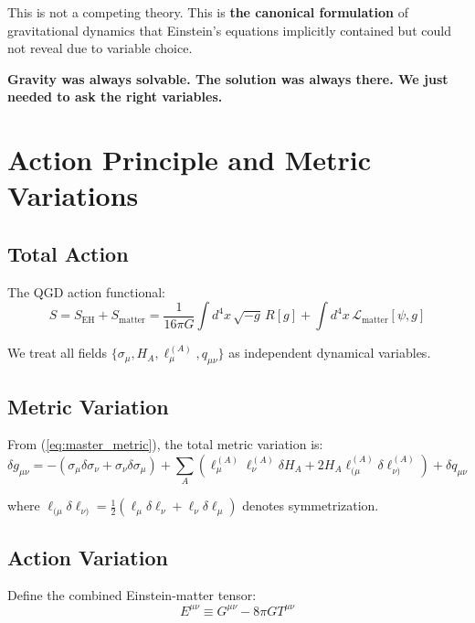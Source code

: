\documentclass[11pt,a4paper]{article}
\theoremstyle{definition}
\theoremstyle{remark}
\begin{document}
		This is not a competing theory. This is \textbf{the canonical formulation} of gravitational dynamics that Einstein's equations implicitly contained but could not reveal due to variable choice.
		
		\textbf{Gravity was always solvable. The solution was always there. We just needed to ask the right variables.}
		
		
		\section{Action Principle and Metric Variations}
		
		\subsection{Total Action}
		
		The QGD action functional:
		\begin{equation}\label{eq:action_total}
			S = S_{\text{EH}} + S_{\text{matter}} = \frac{1}{16\pi G}\int d^4x\, \sqrt{-g}\, R[g] + \int d^4x\, \mathcal{L}_{\text{matter}}[\psi, g]
		\end{equation}
		
		We treat all fields $\{\sigma_\mu, H_A, \ell_\mu^{(A)}, q_{\mu\nu}\}$ as independent dynamical variables.
		
		\subsection{Metric Variation}
		
		From (\ref{eq:master_metric}), the total metric variation is:
		\begin{equation}\label{eq:metric_variation}
			\delta g_{\mu\nu} = -(\sigma_\mu\delta\sigma_\nu + \sigma_\nu\delta\sigma_\mu) + \sum_A\left(\ell_\mu^{(A)}\ell_\nu^{(A)}\delta H_A + 2H_A\ell_{(\mu}^{(A)}\delta\ell_{\nu)}^{(A)}\right) + \delta q_{\mu\nu}
		\end{equation}
		
		where $\ell_{(\mu}\delta\ell_{\nu)} = \frac{1}{2}(\ell_\mu\delta\ell_\nu + \ell_\nu\delta\ell_\mu)$ denotes symmetrization.
		
		\subsection{Action Variation}
		
		Define the combined Einstein-matter tensor:
		\begin{equation}\label{eq:E_tensor}
			E^{\mu\nu} \equiv G^{\mu\nu} - 8\pi G T^{\mu\nu}
		\end{equation}
		
\end{document}
